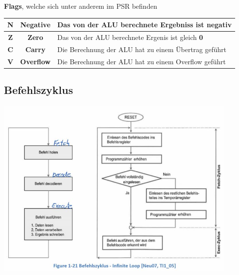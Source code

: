 	\begin{minipage}{9cm}
        \textbf{Flags}, welche sich unter anderem im PSR befinden\newline
        \begin{tabular}{|c|c|l|}
            \hline 
            \textbf{N}  &\textbf{Negative}  & Das von der ALU berechnete Ergebniss ist negativ \\ 
            \hline 
            \textbf{Z}  &\textbf{Zero}      & Das von der ALU berechnete Ergenis ist gleich \textbf{0} \\ 
            \hline 
            \textbf{C}  &\textbf{Carry}     & Die Berechnung der ALU hat zu einem Übertrag geführt  \\ 
            \hline 
            \textbf{V}  &\textbf{Overflow}  & Die Berechnung der ALU hat zu einem Overflow geführt  \\ 
            \hline 
        \end{tabular} 
	\end{minipage}

\subsection{Befehlszyklus}
    \includegraphics[height=9cm]{images/CommandFlowChart}
